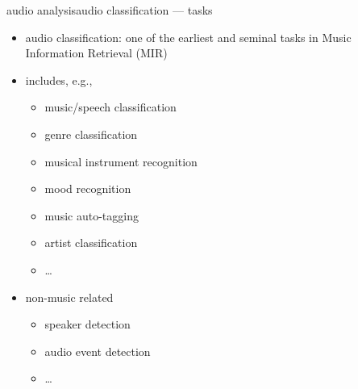         \begin{frame}{audio analysis}{audio classification --- tasks}
            \begin{itemize}
                \item   audio classification: one of the earliest and seminal tasks in Music Information Retrieval (MIR)
                \bigskip
                \item   includes, e.g.,
                    \begin{itemize}
                        \item   music/speech classification
                        \item   genre classification
                        \item   musical instrument recognition
                        \item   mood recognition
                        \item   music auto-tagging
                        \item   artist classification
                        \item   \ldots
                    \end{itemize}
                \bigskip
                 \item<2->  non-music related
                    \begin{itemize}
                        \item   speaker detection
                        \item   audio event detection
                        \item   \ldots
                    \end{itemize}
            \end{itemize}
        \end{frame}

